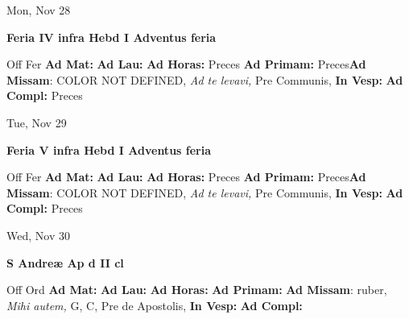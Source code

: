 \documentclass[10pt]{book}
\begin{document}
\begin{center}
\begin{minipage}{3.5in}
\vspace{2em}
\begin{center}Mon, Nov 28
\end{center}
\textbf{ \large Feria IV infra Hebd I Adventus
\textnormal{\normalsize feria}}

\begin{justify}Off Fer
\textbf{Ad Mat: }
\textbf{Ad Lau: }
\textbf{Ad Horas: }Preces
\textbf{Ad Primam: }Preces\textbf{Ad Missam}: COLOR NOT DEFINED, \textit{Ad te levavi,} Pre Communis, 
\textbf{In Vesp: }
\textbf{Ad Compl: }Preces
\end{justify}
\end{minipage}
\end{center}

\begin{center}
\begin{minipage}{3.5in}
\vspace{2em}
\begin{center}Tue, Nov 29
\end{center}
\textbf{ \large Feria V infra Hebd I Adventus
\textnormal{\normalsize feria}}

\begin{justify}Off Fer
\textbf{Ad Mat: }
\textbf{Ad Lau: }
\textbf{Ad Horas: }Preces
\textbf{Ad Primam: }Preces\textbf{Ad Missam}: COLOR NOT DEFINED, \textit{Ad te levavi,} Pre Communis, 
\textbf{In Vesp: }
\textbf{Ad Compl: }Preces
\end{justify}
\end{minipage}
\end{center}

\begin{center}
\begin{minipage}{3.5in}
\vspace{2em}
\begin{center}Wed, Nov 30
\end{center}
\textbf{ \large S Andreæ Ap
\textnormal{\normalsize d II cl}}

\begin{justify}Off Ord
\textbf{Ad Mat: }
\textbf{Ad Lau: }
\textbf{Ad Horas: }
\textbf{Ad Primam: }\textbf{Ad Missam}: ruber, \textit{Mihi autem,} G, C, Pre de Apostolis, 
\textbf{In Vesp: }
\textbf{Ad Compl: }
\end{justify}
\end{minipage}
\end{center}
\end{document}
